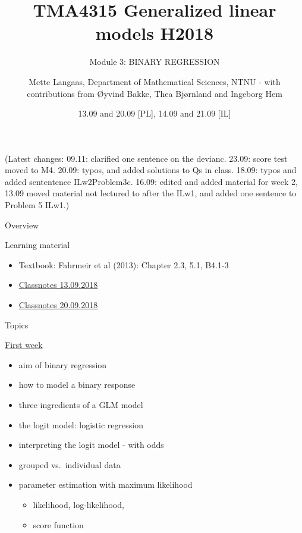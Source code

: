 \documentclass[
  ignorenonframetext,
]{beamer}
\title{TMA4315 Generalized linear models H2018}
\subtitle{Module 3: BINARY REGRESSION}
\author{Mette Langaas, Department of Mathematical Sciences, NTNU - with
contributions from Øyvind Bakke, Thea Bjørnland and Ingeborg Hem}
\date{13.09 and 20.09 {[}PL{]}, 14.09 and 21.09 {[}IL{]}}
\providecommand{\tightlist}{%
  \setlength{\itemsep}{0pt}\setlength{\parskip}{0pt}}
\begin{document}
\frame{\titlepage}

\begin{frame}
(Latest changes: 09.11: clarified one sentence on the devianc. 23.09:
score test moved to M4. 20.09: typos, and added solutions to Qs in
class. 18.09: typos and added sententence ILw2Problem3c. 16.09: edited
and added material for week 2, 13.09 moved material not lectured to
after the ILw1, and added one sentence to Problem 5 ILw1.)
\end{frame}

\begin{frame}{Overview}
\label{overview}
\begin{block}{Learning material}
\label{learning-material}
\begin{itemize}
\tightlist
\item
  Textbook: Fahrmeir et al (2013): Chapter 2.3, 5.1, B4.1-3
\item
  \href{https://www.math.ntnu.no/emner/TMA4315/2018h/TMA4315M3H20180913.pdf}{Classnotes
  13.09.2018}
\item
  \href{https://www.math.ntnu.no/emner/TMA4315/2018h/TMA4315M3H20180920.pdf}{Classnotes
  20.09.2018}
\end{itemize}
\end{block}
\end{frame}

\begin{frame}
\begin{block}{Topics}
\label{topics}
\begin{block}{\hyperlink{firstweek}{First week}}
\label{first-week}
\begin{itemize}
\tightlist
\item
  aim of binary regression
\item
  how to model a binary response
\item
  three ingredients of a GLM model
\item
  the logit model: logistic regression
\item
  interpreting the logit model - with odds
\item
  grouped vs.~individual data
\item
  parameter estimation with maximum likelihood

  \begin{itemize}
  \tightlist
  \item
    likelihood, log-likelihood,
  \item
    score function
  \end{itemize}
\end{itemize}
\end{block}
\end{block}
\end{frame}
\end{document}

